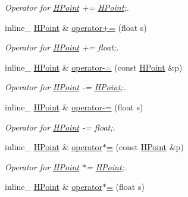 \begin{DoxyCompactItemize}
\begin{DoxyCompactList}\small\item\em Operator for \hyperlink{classHPoint}{H\+Point} += \hyperlink{classHPoint}{H\+Point};. \end{DoxyCompactList}\item 
inline\+\_\+ \hyperlink{classHPoint}{H\+Point} \& \hyperlink{classHPoint_a0b8c23b373a2cb54d42dafb6cd123414}{operator+=} (float s)\hypertarget{classHPoint_a0b8c23b373a2cb54d42dafb6cd123414}{}\label{classHPoint_a0b8c23b373a2cb54d42dafb6cd123414}

\begin{DoxyCompactList}\small\item\em Operator for \hyperlink{classHPoint}{H\+Point} += float;. \end{DoxyCompactList}\item 
inline\+\_\+ \hyperlink{classHPoint}{H\+Point} \& \hyperlink{classHPoint_a44ea2d9212a5b9af9a94f44524b8ef31}{operator-\/=} (const \hyperlink{classHPoint}{H\+Point} \&p)\hypertarget{classHPoint_a44ea2d9212a5b9af9a94f44524b8ef31}{}\label{classHPoint_a44ea2d9212a5b9af9a94f44524b8ef31}

\begin{DoxyCompactList}\small\item\em Operator for \hyperlink{classHPoint}{H\+Point} -\/= \hyperlink{classHPoint}{H\+Point};. \end{DoxyCompactList}\item 
inline\+\_\+ \hyperlink{classHPoint}{H\+Point} \& \hyperlink{classHPoint_ad0a7b9c76d96a76b42659de9d33b3930}{operator-\/=} (float s)\hypertarget{classHPoint_ad0a7b9c76d96a76b42659de9d33b3930}{}\label{classHPoint_ad0a7b9c76d96a76b42659de9d33b3930}

\begin{DoxyCompactList}\small\item\em Operator for \hyperlink{classHPoint}{H\+Point} -\/= float;. \end{DoxyCompactList}\item 
inline\+\_\+ \hyperlink{classHPoint}{H\+Point} \& \hyperlink{classHPoint_a821dfc65bc17abdfefc46b500272bc6f}{operator$\ast$=} (const \hyperlink{classHPoint}{H\+Point} \&p)\hypertarget{classHPoint_a821dfc65bc17abdfefc46b500272bc6f}{}\label{classHPoint_a821dfc65bc17abdfefc46b500272bc6f}

\begin{DoxyCompactList}\small\item\em Operator for \hyperlink{classHPoint}{H\+Point} $\ast$= \hyperlink{classHPoint}{H\+Point};. \end{DoxyCompactList}\item 
inline\+\_\+ \hyperlink{classHPoint}{H\+Point} \& \hyperlink{classHPoint_a92fab606277095841cf6bd6c9a709ed3}{operator$\ast$=} (float s)\hypertarget{classHPoint_a92fab606277095841cf6bd6c9a709ed3}{}\label{classHPoint_a92fab606277095841cf6bd6c9a709ed3}


\end{DoxyCompactItemize}
